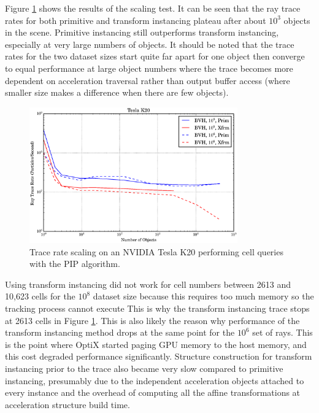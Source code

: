 Figure \ref{prelim_optix_scaling} shows the results of the scaling test. It can be seen that the ray trace rates for both primitive and transform instancing plateau after about $10^3$ objects in the scene. %
 Primitive instancing still outperforms transform instancing, especially at very large numbers of objects.%
   It should be noted that the trace rates for the two dataset sizes start quite far apart for one object then converge to equal performance at large object numbers where the trace becomes more dependent on acceleration traversal rather than output buffer access (where smaller size makes a difference when there are few objects). %

\begin{figure}[h!] 
  \centering
    \includegraphics[width=0.8\textwidth]{graphics/prelim_optix_scaling.eps}
     \caption{Trace rate scaling on an NVIDIA Tesla K20 performing cell queries with the PIP algorithm. \label{prelim_optix_scaling} }
\end{figure}

Using transform instancing did not work for cell numbers between 2613 and 10,623 cells for the $10^8$ dataset size because this requires too much memory so the tracking process cannot execute %
This is why the transform instancing trace stops at 2613 cells in Figure \ref{prelim_optix_scaling}.  This is also likely the reason why performance of the transform instancing method drops at the same point for the $10^6$ set of rays.  This is the point where OptiX started paging GPU memory to the host memory, and this cost degraded performance significantly.  Structure construction for transform instancing prior to the trace also became very slow compared to primitive instancing, presumably due to the independent acceleration objects attached to every instance and the overhead of computing all the affine transformations at acceleration structure build time.


